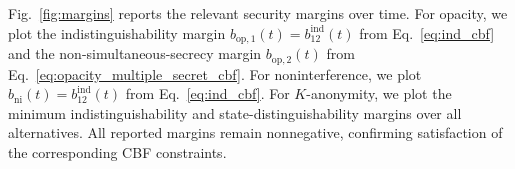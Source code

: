 \documentclass[journal,twoside,web]{ieeecolor}
\begin{document}
Fig.~\ref{fig:margins} reports the relevant security margins over time. For opacity, we plot the indistinguishability margin $b_{\mathrm{op},1}(t) = b_{12}^\mathrm{ind}(t)$ from Eq.~\eqref{eq:ind_cbf} and the non-simultaneous-secrecy margin $b_{\mathrm{op},2}(t)$ from Eq.~\eqref{eq:opacity_multiple_secret_cbf}. For noninterference, we plot $b_{\mathrm{ni}}(t) = b_{12}^\mathrm{ind}(t)$ from Eq.~\eqref{eq:ind_cbf}. For $K$-anonymity, we plot the minimum indistinguishability and state-distinguishability margins over all alternatives. All reported margins remain nonnegative, confirming satisfaction of the corresponding CBF constraints.

\end{document}

